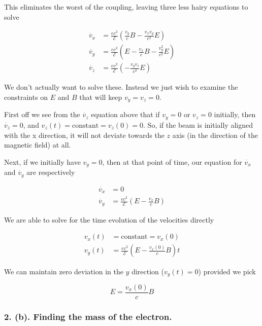 This eliminates the worst of the coupling, leaving three less hairy equations to solve

\begin{align}\label{eqn:relElectroDynProblemSet2:350}
\dot{v_x} &= \frac{e c^2}{\mathcal{E}} \left( \frac{v_y}{c} B - \frac{v_x v_y}{c^2} E \right) \\
\dot{v_y} &= \frac{e c^2}{\mathcal{E}} \left( E - \frac{v_x}{c} B - \frac{v_y^2}{c^2} E \right) \\
\dot{v_z} &= \frac{e c^2}{\mathcal{E}} \left( - \frac{v_y v_z}{c^2} E \right)
\end{align}

We don't actually want to solve these.  Instead we just wish to examine the constraints on $E$ and $B$ that will keep $v_y = v_z = 0$.

First off we see from the $\dot{v_z}$ equation above that if $v_y = 0$ or $v_z = 0$ initially, then $\dot{v_z} = 0$, and $v_z(t) = \text{constant} = v_z(0) = 0$.  So, if the beam is initially aligned with the x direction, it will not deviate towards the $z$ axis (in the direction of the magnetic field) at all.

Next, if we initially have $v_y = 0$, then at that point of time, our equation for $\dot{v_x}$ and $\dot{v_y}$ are respectively

\begin{align}\label{eqn:relElectroDynProblemSet2:370}
\dot{v_x} &= 0 \\
\dot{v_y} &= \frac{e c^2}{\mathcal{E}} \left( E - \frac{v_x}{c} B \right) 
\end{align}

We are able to solve for the time evolution of the velocities directly

\begin{align}\label{eqn:relElectroDynProblemSet2:390}
v_x(t) &= \text{constant} = v_x(0) \\
v_y(t) &= \frac{e c^2}{\mathcal{E}} \left( E - \frac{v_x(0)}{c} B \right) t
\end{align}

We can maintain zero deviation in the $y$ direction ($v_y(t) = 0$) provided we pick

\begin{equation}\label{eqn:relElectroDynProblemSet2:410}
E = \frac{v_x(0)}{c} B
\end{equation}

\subsubsection{2. (b). Finding the mass of the electron.}


